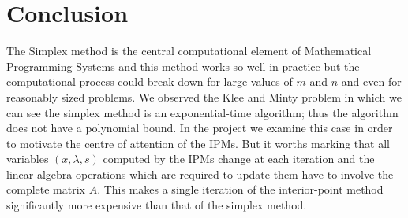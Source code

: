 \documentclass[a4paper,10 pt,titlepage,twoside]{report}
\theoremstyle{plain}
\theoremstyle{definition}
\theoremstyle{remark}
\begin{document}
{{\chapter{Conclusion}
The Simplex method is the central computational element of Mathematical Programming Systems and this method works so well in practice but the computational process could break down for large values of $m$ and $n$ and even for reasonably sized problems.
We observed the Klee and Minty problem in which we can see the simplex method is an exponential-time algorithm; thus the algorithm does not have a polynomial bound. In the project we examine this case in order to motivate the centre of attention of the IPMs.
But it worths marking that all variables $(x, \lambda, s)$ computed by the IPMs change at each iteration and the linear algebra operations which are required to update them have to involve the complete matrix $A$. This makes a single iteration of the interior-point method significantly more expensive than that of the simplex method.\\

}}
\end{document}
